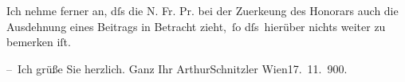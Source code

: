 \pstart
           Ich nehme ferner an, dſs die N. Fr. Pr. bei der
               Zuerke{\geminationn}ung des Honorars auch die Ausdehnung eines Beitrags in Betracht zieht, ſo
               dſs hierüber nichts weiter zu bemerken iſt.\pend
           
\pstart
           {\pb}– Ich grüße Sie herzlich.\pend
           \pstart Ganz Ihr \spacefill\mbox{ArthurSchnitzler}\pend{}
\pstart
           Wien17. 11. 900.\pend
           \endnumbering{}
\begin{anhang}
\end{anhang}\newcommand{\dateiname}{L03936}\newcommand{\titel}{Arthur Schnitzler an Theodor Herzl, 17. 11. 1900}\newcommand{\editorInnen}{Herausgegeben von Jahnke, SelmaMüller, Martin Anton}
